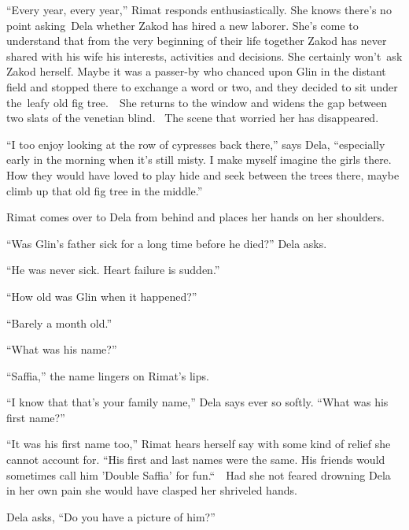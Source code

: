 \documentclass[twoside,11pt]{book}
\begin{document}
``Every year, every year,'' Rimat responds enthusiastically. She knows there's no point
asking~Dela whether Zakod has hired a new laborer. She's come to understand that from the very beginning of their life
together Zakod has never shared with his wife his interests, activities and decisions{. }She certainly
won't{\ }ask Zakod herself. Maybe it was a passer-by who chanced upon Glin in the distant field and
stopped there to exchange a word or two, and they decided to sit under the{\ }leafy old fig tree.~\ She
returns to the window and widens the gap between two slats of the venetian blind. ~The scene that worried her has
disappeared. 

``I too enjoy looking at the row of cypresses back there,'' says Dela,
``especially early in the morning when it's still misty. I make myself imagine the girls there. How they
would have loved to play hide and seek between the trees there, maybe climb up that old fig tree in the
middle.''

Rimat comes over to Dela from behind and places her hands on her shoulders. 

``Was Glin's father sick for a long time before he died?'' Dela asks.

``He was never sick. Heart failure is sudden.''

``How old was Glin when it happened?''

``Barely a month old.''

``What was his name?''

``Saffia,'' the name lingers on Rimat's lips.

``I know that that's your family name,'' Dela says ever so softly. ``What was his
first name?'' 

``It was his first name too,'' Rimat hears herself say with some kind of relief she cannot
account for. ``His first and last names were the same. His friends would sometimes call him 'Double
Saffia' for fun.``\ \ Had she not feared drowning Dela in her own pain she would have clasped her
shriveled hands.\ 

Dela asks, ``Do you have a picture of him?''
\end{document}
